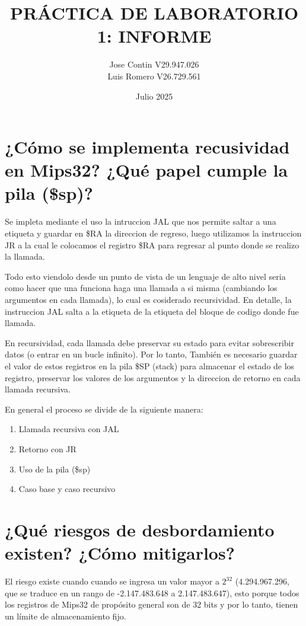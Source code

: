 \documentclass{article}
\title{PRÁCTICA DE LABORATORIO 1: INFORME}
\author{Jose Contin V29.947.026\\ Luis Romero V26.729.561}
\date{Julio 2025}
\begin{document}
\maketitle

\begingroup
\raggedright

\section{¿Cómo se implementa recusividad en Mips32? ¿Qué papel cumple la pila (\$sp)?}

\indent\indent Se impleta mediante el uso la intruccion JAL que nos permite saltar a una etiqueta y guardar en \$RA la direccion de regreso, luego utilizamos la instruccion JR a la cual le colocamos el registro \$RA para regresar al punto donde se realizo la llamada.\newline

\noindent Todo esto viendolo desde un punto de vista de un lenguaje de alto nivel seria como hacer que una funciona haga una llamada a si misma (cambiando los argumentos en cada llamada), lo cual es cosiderado recursividad. En detalle, la instruccion JAL salta a la etiqueta de la etiqueta del bloque de codigo donde fue llamada.\newline
            
\noindent En recursividad, cada llamada debe preservar su estado para evitar sobrescribir datos (o entrar en un bucle infinito). Por lo tanto, También es necesario guardar el valor de estos registros en la pila \$SP (stack) para almacenar el estado de los registro, preservar los valores de los argumentos y la direccion de retorno en cada llamada recursiva.\newline

En general el proceso se divide de la siguiente manera:
\begin{enumerate}
\item {Llamada recursiva con JAL}
\item {Retorno con JR}
\item {Uso de la pila (\$sp)}
\item {Caso base y caso recursivo}
\end{enumerate}
\newpage

\section{¿Qué riesgos de desbordamiento existen? ¿Cómo mitigarlos?}
El riesgo existe cuando cuando se ingresa un valor mayor a \(2^{32}\) (4.294.967.296, que se traduce en un rango de -2.147.483.648 a 2.147.483.647), esto porque todos los registros de Mips32 de propósito general son de 32 bits y por lo tanto, tienen un límite de almacenamiento fijo.\newline
\end{document}
